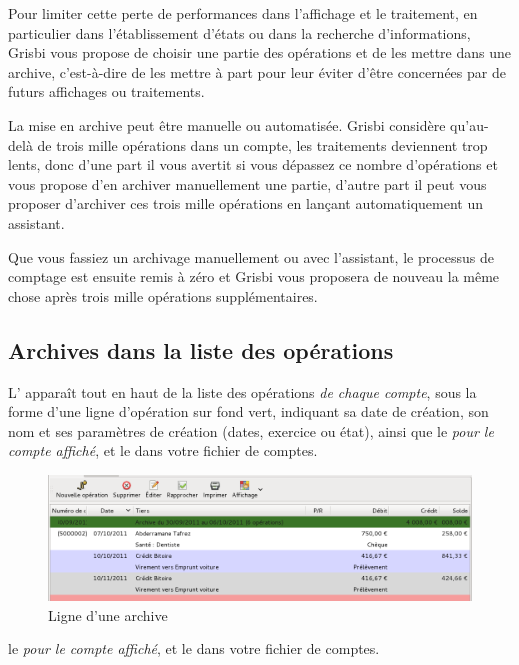 Pour limiter cette perte de performances dans l'affichage et le traitement, en particulier dans l'établissement d'états ou dans la recherche d'informations, Grisbi vous propose de choisir une partie des opérations et de les mettre dans une archive, c'est-à-dire de les mettre à part pour leur éviter d'être concernées par de futurs affichages ou traitements.  

La mise en archive peut être manuelle ou automatisée. Grisbi considère qu'au-delà de trois mille opérations{\valeur} dans un compte, les traitements deviennent trop lents, donc d'une part il vous avertit si vous dépassez ce nombre d'opérations et vous propose d'en archiver manuellement une partie, d'autre part il peut vous proposer d'archiver ces  trois mille opérations en lançant automatiquement un assistant.

Que vous fassiez un archivage manuellement ou avec l'assistant, le processus de comptage est ensuite remis à zéro et Grisbi vous proposera de nouveau la même chose après trois mille opérations supplémentaires.


\subsection{Archives dans la liste des opérations\label{datamanagement-history-list}}

L' apparaît tout en haut de la liste des opérations \emph{de chaque compte}, sous la forme d'une ligne d'opération sur fond vert{\couleur}, indiquant sa date de création, son nom et ses paramètres de création (dates, exercice ou état), ainsi que \ifIllustration le  \emph{pour le compte affiché}, et le  dans votre fichier de comptes.

\begin{figure}[htbp]
\begin{center}
\includegraphics[scale=0.5]{image/screenshot/datamanagement_history_line}
\end{center}
\caption{Ligne d'une archive}
\label{datamanagement-history-line-img}
\end{figure}
\else le  \emph{pour le compte affiché}, et le  dans votre fichier de comptes.
\fi

